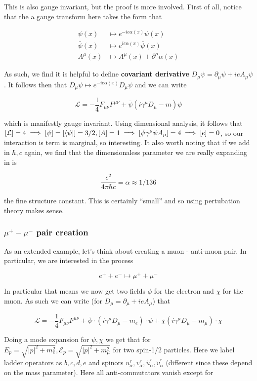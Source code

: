 \documentclass{article}
\theoremstyle{definition}
\begin{document}
This is also gauge invariant, but the proof is more involved. First of all,
notice that the a gauge transform here takes the form that

\begin{align*}
  \psi(x) &\mapsto e^{-i e \alpha(x)} \psi(x) \\
  \bar{\psi}(x) &\mapsto  e^{i e \alpha(x)} \bar{\psi}(x) \\
  A^\mu(x) &\mapsto A^\mu(x) + \partial^\mu \alpha(x)
\end{align*}

As such, we find it is helpful to define \textbf{covariant derivative} $D_\mu
\psi = \partial_\mu \psi + ie A_\mu \psi$. It follows then that $D_\mu \psi
\mapsto e^{-ie\alpha(x)} D_\mu \psi$ and we can write

$$ \mathcal{L} = -\frac{1}{4} F_{\mu \nu} F^{\mu \nu} + \bar{\psi}(i \gamma^\mu
D_\mu - m ) \psi $$

which is manifestly gauge invariant. Using dimensional analysis, it follows that
$[\mathcal{L}] = 4 \implies [\psi] = [\bra{\psi}] = 3/2, [A] = 1 \implies
[\bar{\psi} \gamma^\mu \psi A_\mu] = 4 \implies [e] = 0$, so our interaction is
term is marginal, so interesting. It also worth noting that if we add in $\hbar,
c$ again, we find that the dimensionaless parameter we are really expanding in
is

$$ \frac{e^2}{4\pi \hbar c} = \alpha \approx 1/136 $$

the fine structure constant. This is certainly ``small'' and so using
pertubation theory makes sense.

\subsubsection{$\mu^+ - \mu^-$ pair creation}

As an extended example, let's think about creating a muon - anti-muon pair. In
particular, we are interested in the process

$$ e^+ + e^- \mapsto \mu^+ + \mu^- $$

In particular that means we now get two fields $\phi$ for the electron and
$\chi$ for the muon. As such we can write (for $D_\mu = \partial_\mu + i e
A_\mu$) that

$$ \mathcal{L} = -\frac{1}{4} F_{\mu \nu} F^{\mu \nu} + \bar{\psi} \cdot (i
\gamma^\mu D_\mu - m_e) \cdot \psi + \bar{\chi} (i \gamma^\mu D_\mu - m_\mu)
\cdot \chi $$

Doing a mode expansion for $\psi, \chi$ we get that for $E_p = \sqrt{|p|^2 +
  m_e^2}, \mathcal{E}_p = \sqrt{|p|^2 + m_\mu^2}$ for two spin-1/2 particles.
Here we label ladder operators as $b, c, d, e$ and spinors $u_\alpha^r,
v_\alpha^r, \tilde{u}_\alpha^r, \tilde{v}_\alpha^r$ (different since these
depend on the mass parameter). Here all anti-commutators vanish except for
\end{document}
